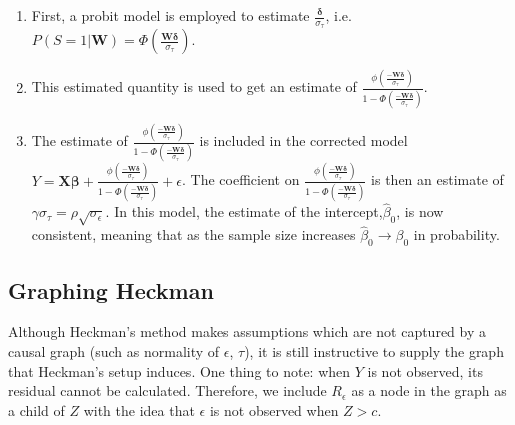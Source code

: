 \documentclass[12pt,twoside]{reedthesis}
\theoremstyle{definition}
\begin{document}
\begin{enumerate}
\item  First, a probit model is employed to estimate $\frac{\boldsymbol{\delta}}{\sigma_\tau}$, i.e. $P(S = 1 | \mathbf{W}) = \Phi(\frac{ \mathbf{W} \boldsymbol{\delta}}{\sigma_{\tau}})$. 

\item This estimated quantity is used to get an estimate of  $\frac{\phi(\frac{-\mathbf{W} \boldsymbol{\delta}}{\sigma_\tau})}{1 - \Phi(\frac{-\mathbf{W} \boldsymbol{\delta}}{\sigma_\tau})}$.

\item The estimate of $\frac{\phi(\frac{-\mathbf{W} \boldsymbol{\delta}}{\sigma_\tau})}{1 - \Phi(\frac{-\mathbf{W} \boldsymbol{\delta}}{\sigma_\tau})}$ is included in the corrected model $Y = \mathbf{X} \boldsymbol{\beta} + \frac{\phi(\frac{-\mathbf{W} \boldsymbol{\delta}}{\sigma_\tau})}{1 - \Phi(\frac{-\mathbf{W} \boldsymbol{\delta}}{\sigma_\tau})} + \epsilon$. The coefficient on $\frac{\phi(\frac{-\mathbf{W} \boldsymbol{\delta}}{\sigma_\tau})}{1 - \Phi(\frac{-\mathbf{W} \boldsymbol{\delta}}{\sigma_\tau})}$ is then an estimate of $\gamma \sigma_\tau = \rho \sqrt{\sigma_\epsilon}$. In this model, the estimate of the intercept,$\hat \beta_0$, is now consistent, meaning that as the sample size increases $\hat \beta_0 \rightarrow \beta_0$ in probability.
\end{enumerate}


\subsection{Graphing Heckman}
Although Heckman's method makes assumptions which are not captured by a causal graph (such as normality of $\epsilon$, $\tau$), it is still instructive to supply the graph that Heckman's setup induces. One thing to note: when $Y$ is not observed, its residual cannot be calculated. Therefore, we include $R_\epsilon$ as a node in the graph as a child of $Z$ with the idea that $\epsilon$ is not observed when $Z  > c$.
\end{document}

